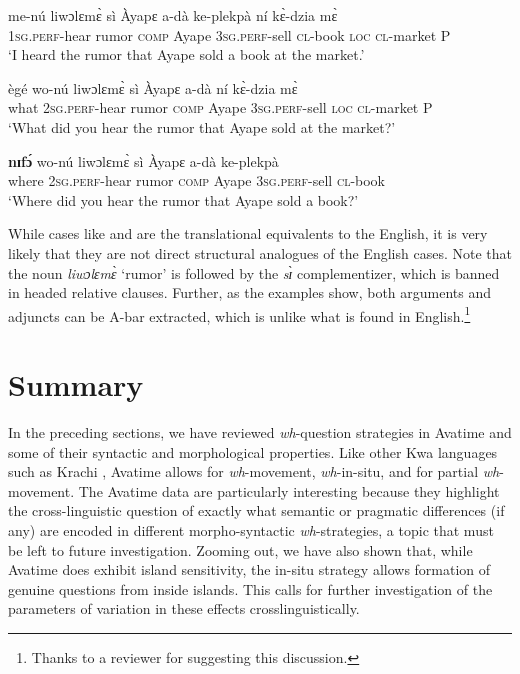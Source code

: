 \documentclass[output=paper]{langscibook}
\begin{document}
\ea \label{ex:devlin:cp-comp}
\begin{xlist}
\ex \label{ex:devlin:cp-comp-base}
\gll me-n\'{u} liwɔlɛm\`{ɛ} s\`{i} \`{A}yapɛ a-d\`{a} ke-plekp\`{a} n\'{i} k\`{ɛ}-dzia m\`{ɛ}\\
1\textsc{sg.perf}-hear rumor \textsc{comp} Ayape 3\textsc{sg.perf}-sell \textsc{cl}-book \textsc{loc} \textsc{cl}-market P \\
\glt `I heard the rumor that Ayape sold a book at the market.’

\ex \label{ex:devlin:cp-comp-move}
\gll \`{e}g\'{e} wo-n\'{u} liwɔlɛm\`{ɛ} s\`{i} \`{A}yapɛ a-d\`{a} n\'{i} k\`{ɛ}-dzia m\`{ɛ}\\
what 2\textsc{sg.perf}-hear rumor \textsc{comp} Ayape 3\textsc{sg.perf}-sell \textsc{loc} \textsc{cl}-market P  \\
\glt `What did you hear the rumor that Ayape sold at the market?’

\ex \label{ex:devlin:cp-comp-move-when}
\gll \textbf{nɪf\'{ɔ}} wo-n\'{u} liwɔlɛm\`{ɛ} s\`{i} \`{A}yapɛ a-d\`{a} ke-plekp\`{a}\\
where 2\textsc{sg.perf}-hear rumor \textsc{comp} Ayape 3\textsc{sg.perf}-sell \textsc{cl}-book\\
\glt `Where did you hear the rumor that Ayape sold a book?’
\end{xlist}
\z

While cases like  and  are the translational equivalents to the English, it is very likely that they are not direct structural analogues of the  English cases. Note that the noun \textit{liwɔlɛm\`{ɛ}} `rumor’ is followed by the \textit{s\`ɪ} complementizer, which is banned in headed relative clauses.  Further, as the examples show, both arguments and adjuncts can be A-bar extracted, which is unlike what is found in English.\footnote{Thanks to a reviewer for suggesting this discussion.} 


\section{Summary}
In the preceding sections, we have reviewed \textit{wh}-question strategies in Avatime and some of their syntactic and morphological properties.  Like other Kwa languages such as Krachi \citep{torrence2015wh}, Avatime allows for \textit{wh}-movement, \textit{wh}-in-situ, and for partial \textit{wh}-movement.  The Avatime data are particularly interesting because they highlight the cross-linguistic question of exactly what semantic or pragmatic differences (if any) are encoded in different morpho-syntactic \textit{wh}-strategies, a topic that must be left to future investigation.  Zooming out, we have also shown that, while Avatime does exhibit island sensitivity, the in-situ strategy allows formation of genuine questions from inside islands.  This calls for further investigation of the parameters of variation in these effects crosslinguistically. 
\end{document}
